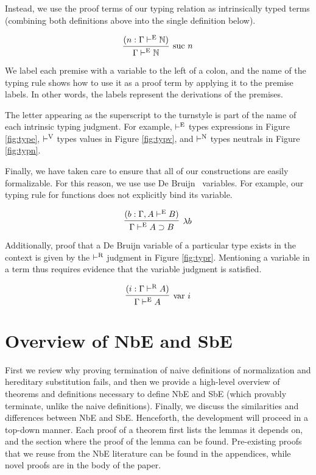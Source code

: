 \documentclass{llncs}
\newcommand{\reffig}[1]{Figure \ref{fig:#1}}
\def\arr{\supset}
\def\lam{\lambda}
\def\nat{\mathbb{N}}
\newcommand{\turn}[1]{\vdash^\con{#1}}
\newcommand{\con}[1]{\textmd{#1}}
\newcommand{\fun}[1]{\textmd{#1}}
\newcommand{\type}[1]{\Gamma \turn{E} #1}
\newcommand{\ctype}[2]{\Gamma , #1 \turn{E} #2}
\newcommand{\typr}[1]{\Gamma \turn{R} #1}
\begin{document}
Instead, we use the proof terms of our typing relation as
intrinsically typed terms (combining both definitions above into the
single definition below).

$$
\infer
  [\con{suc} ~ n]
  {\type{\nat}}
{
  (n : \type{\nat})
}
$$

We label each premise with a variable to
the left of a colon, and the name of the typing rule shows how to use
it as a proof term by applying it to the premise labels. In other
words, the labels represent the derivations of the premises.

The letter appearing as the superscript to the turnstyle is part of
the name of each intrinsic typing judgment. For example, $\turn{E}$
types expressions in \reffig{type}, $\turn{V}$ types values in
\reffig{typv}, and $\turn{N}$ types neutrals in \reffig{typn}.

Finally, we have taken care to ensure that all of our constructions
are easily formalizable. For this reason, we
use use De Bruijn~\cite{TODO} variables. For example, our typing rule
for functions does not explicitly bind its variable.

$$
\infer
  [\lam b]
  {\type{A \arr B}}
{
  (b : \ctype{A}{B})
}
$$

Additionally, proof that a De Bruijn variable of a particular type
exists in the context is given by the $\turn{R}$ judgment in
\reffig{typr}. Mentioning a variable in a term thus requires evidence
that the variable judgment is satisfied.

$$
\infer
  [\fun{var} ~ i]
  {\type{A}}
{
  (i : \typr{A})
}
$$

\section{Overview of NbE and SbE}
\label{sec:overview}

First we review why proving termination of naive definitions of
normalization and hereditary substitution fails, and then we provide a
high-level overview of theorems and definitions necessary to define NbE
and SbE (which provably terminate, unlike the naive definitions).
Finally, we discuss the similarities and differences between NbE and
SbE.
Henceforth, the development will proceed in a top-down manner.
Each proof of a theorem first lists the lemmas it depends on, and
the section where the proof of the lemma can be found. Pre-existing
proofs that we reuse from the NbE literature can be found in the
appendices, while novel proofs are in the body of the paper.
\end{document}
